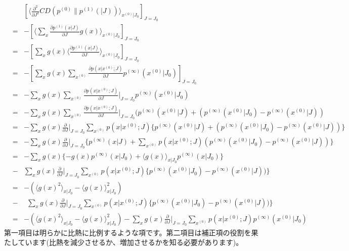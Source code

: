 \documentclass[11pt]{article}
\begin{document}
\begin{eqnarray}
	&&[\langle\frac{\partial^2}{\partial J^2}CD(p^{(0)}\|p^{(1)}(|J)) \rangle_{x^{(0)}|J_0}]_{J=J_0}\\
&=&-[\langle \sum_{x}\frac{\partial p^{(1)}(x|J)}{\partial J}g(x)\rangle_{x^{(0)}|J_0}]_{J=J_0}\\
&=&-[\sum_{x}g(x)\langle \frac{\partial p^{(1)}(x|J)}{\partial J}\rangle_{x^{(0)}|J_0}]_{J=J_0}\\
&=&-[\sum_{x}g(x)\sum_{x^{(0)}}\frac{\partial p(x|x^{(0)};J)} {\partial J}p^{(\infty)}(x^{(0)}|J_0)]_{J=J_0}\\
&=&-\sum_{x}g(x)\sum_{x^{(0)}}\frac{\partial p(x|x^{(0)};J)} {\partial J}|_{J=J_0}p^{(\infty)}(x^{(0)}|J_0)\\
&=&-\sum_{x}g(x)\sum_{x^{(0)}}\frac{\partial p(x|x^{(0)};J)} {\partial J}|_{J=J_0}(p^{(\infty)}(x^{(0)}|J) +(p^{(\infty)}(x^{(0)}|J_0)-p^{(\infty)}(x^{(0)}|J))\\
&=&-\sum_{x}  g(x) \frac{\partial } {\partial J}|_{J=J_0} \sum_{x^{(0)}} p(x|x^{(0)};J) \{p^{(\infty)}(x^{(0)}|J) +(p^{(\infty)}(x^{(0)}|J_0)-p^{(\infty)}(x^{(0)}|J)) \}\\
&=&-\sum_{x}  g(x) \frac{\partial } {\partial J}|_{J=J_0} \{ p^{(\infty)}(x|J)  + \sum_{x^{(0)}} p(x|x^{(0)};J)(p^{(\infty)}(x^{(0)}|J_0)-p^{(\infty)}(x^{(0)}|J)) \}\\
&=&-\sum_{x}  g(x)  \{ -g(x)p^{(\infty)}(x|J_0)+\langle g(x)\rangle_{x|J_0}p^{(\infty)}(x|J_0) \}  \\
&-&\sum_{x}  g(x) \frac{\partial } {\partial J}|_{J=J_0}\sum_{x^{(0)}} p(x|x^{(0)};J)\{p^{(\infty)}(x^{(0)}|J_0)-p^{(\infty)}(x^{(0)}|J)) \}\\
&=&-(\langle g(x)^2\rangle_{x|J_0} -\langle g(x)\rangle_{x|J_0}^2 )  \\
&-&\ \ \sum_{x}  g(x) \frac{\partial } {\partial J}|_{J=J_0}\sum_{x^{(0)}} p(x|x^{(0)};J)\{p^{(\infty)}(x^{(0)}|J_0)-p^{(\infty)}(x^{(0)}|J)) \}\\
&=&-(\langle g(x)^2\rangle_{x|J_0} -\langle g(x)\rangle_{x|J_0}^2 )- \sum_{x}  g(x) \frac{\partial } {\partial J}|_{J=J_0}\sum_{x^{(0)}} p(x|x^{(0)};J)p^{(\infty)}(x^{(0)}|J_0)  
\end{eqnarray}
第一項目は明らかに比熱に比例するような項です。第二項目は補正項の役割を果たしています(比熱を減少させるか、増加させるかを知る必要があります)。
\end{document}
